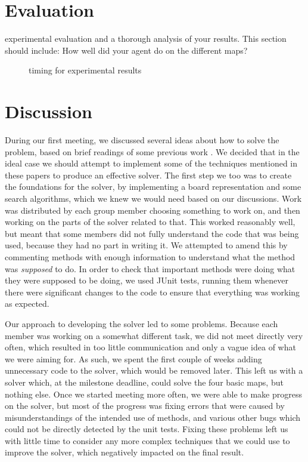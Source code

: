 \documentclass[a4paper,11pt]{article}
\begin{document}
\section{Evaluation}
experimental evaluation and a thorough analysis of your results. This section should include:
How well did your agent do on the different maps?
\begin{figure}
  \centering

  \caption{timing for experimental results}
  \label{fig:exptime}
\end{figure}
\section{Discussion}
During our first meeting, we discussed several ideas about how to solve the
problem, based on brief readings of some previous work \cite{virkkala, jung}. We
decided that in the ideal case we should attempt to implement some of the
techniques mentioned in these papers to produce an effective solver. The first
step we too was to create the foundations for the solver, by implementing a
board representation and some search algorithms, which we knew we would need
based on our discussions. Work was distributed by each group member choosing
something to work on, and then working on the parts of the solver related to
that. This worked reasonably well, but meant that some members did not fully
understand the code that was being used, because they had no part in writing
it. We attempted to amend this by commenting methods with enough information to
understand what the method was \emph{supposed} to do. In order to check that
important methods were doing what they were supposed to be doing, we used JUnit
tests, running them whenever there were significant changes to the code to
ensure that everything was working as expected.

Our approach to developing the solver led to some problems. Because each member
was working on a somewhat different task, we did not meet directly very often,
which resulted in too little communication and only a vague idea of what we were
aiming for. As such, we spent the first couple of weeks adding unnecessary code
to the solver, which would be removed later. This left us with a solver which,
at the milestone deadline, could solve the four basic maps, but nothing
else. Once we started meeting more often, we were able to make progress on the
solver, but most of the progress was fixing errors that were caused by
misunderstandings of the intended use of methods, and various other bugs which
could not be directly detected by the unit tests. Fixing these problems left us
with little time to consider any more complex techniques that we could use to
improve the solver, which negatively impacted on the final result.
\end{document}

